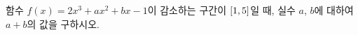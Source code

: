 함수 $f(x)=2x^3+ax^2+bx-1$이 감소하는 구간이 $[1{,}\mkern3mu\mathopen{}5]$일 때, 실수 $a$, $b$에 대하여 $a+b$의 값을 구하시오.
